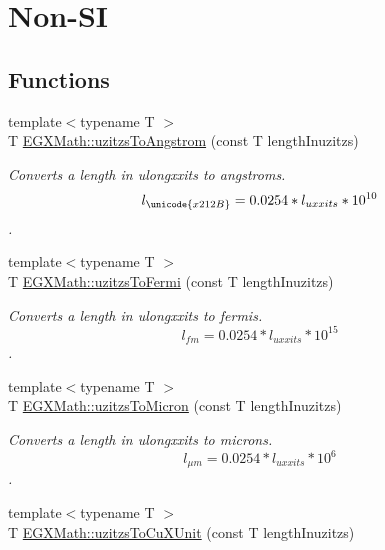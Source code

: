 \hypertarget{group___e_g_x_math-_conversions-_length_conversions-_imperial-uzitzs-_non-_s_i}{}\section{Non-\/\+SI}
\label{group___e_g_x_math-_conversions-_length_conversions-_imperial-uzitzs-_non-_s_i}
\subsection*{Functions}
\begin{DoxyCompactItemize}
\item 
{\footnotesize template$<$typename T $>$ }\\T \mbox{\hyperlink{group___e_g_x_math-_conversions-_length_conversions-_imperial-uzitzs-_non-_s_i_gaaaecee65b1db5abcc71e18526e7073eb}{E\+G\+X\+Math\+::uzitzs\+To\+Angstrom}} (const T length\+Inuzitzs)
\begin{DoxyCompactList}\small\item\em Converts a length in ulongxxits to angstroms. \[ l_{\unicode{x212B}}=0.0254 * l_{uxxits} * 10^{10} \]. \end{DoxyCompactList}\item 
{\footnotesize template$<$typename T $>$ }\\T \mbox{\hyperlink{group___e_g_x_math-_conversions-_length_conversions-_imperial-uzitzs-_non-_s_i_ga920cd8aae6bc9f70faa49a6a5c988040}{E\+G\+X\+Math\+::uzitzs\+To\+Fermi}} (const T length\+Inuzitzs)
\begin{DoxyCompactList}\small\item\em Converts a length in ulongxxits to fermis. \[ l_{fm}=0.0254 * l_{uxxits} * 10^{15} \]. \end{DoxyCompactList}\item 
{\footnotesize template$<$typename T $>$ }\\T \mbox{\hyperlink{group___e_g_x_math-_conversions-_length_conversions-_imperial-uzitzs-_non-_s_i_ga695a8fd8870537930d6378e99ad2aa9f}{E\+G\+X\+Math\+::uzitzs\+To\+Micron}} (const T length\+Inuzitzs)
\begin{DoxyCompactList}\small\item\em Converts a length in ulongxxits to microns. \[ l_{\mu m}=0.0254 * l_{uxxits} * 10^{6} \]. \end{DoxyCompactList}\item 
{\footnotesize template$<$typename T $>$ }\\T \mbox{\hyperlink{group___e_g_x_math-_conversions-_length_conversions-_imperial-uzitzs-_non-_s_i_gab25470e41b88c41d4bf32622baa6c472}{E\+G\+X\+Math\+::uzitzs\+To\+Cu\+X\+Unit}} (const T length\+Inuzitzs)

\end{DoxyCompactItemize}
